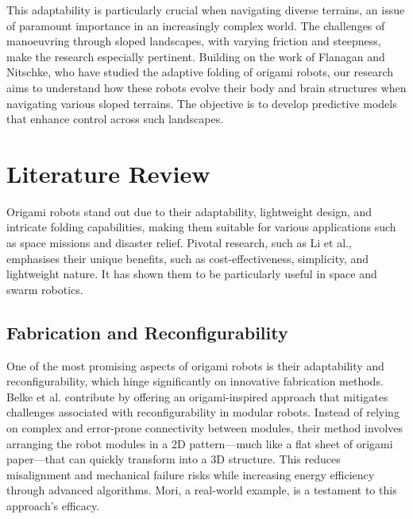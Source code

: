 \documentclass{sigchi}
\begin{document}
This adaptability is particularly crucial when navigating diverse terrains, an issue of paramount importance in an increasingly complex world. The challenges of manoeuvring through sloped landscapes, with varying friction and steepness, make the research especially pertinent. Building on the work of Flanagan and Nitschke\cite{flanagan_evolving_2023}, who have studied the adaptive folding of origami robots, our research aims to understand how these robots evolve their body and brain structures when navigating various sloped terrains. The objective is to develop predictive models that enhance control across such landscapes.




\section{Literature Review}
Origami robots stand out due to their adaptability, lightweight design, and intricate folding capabilities, making them suitable for various applications such as space missions and disaster relief. Pivotal research, such as Li et al., emphasises their unique benefits, such as cost-effectiveness, simplicity, and lightweight nature. It has shown them to be particularly useful in space and swarm robotics\cite{li_soft_2018}.


\subsection{Fabrication and Reconfigurability}
One of the most promising aspects of origami robots is their adaptability and reconfigurability, which hinge significantly on innovative fabrication methods. Belke et al. contribute by offering an origami-inspired approach that mitigates challenges associated with reconfigurability in modular robots. Instead of relying on complex and error-prone connectivity between modules, their method involves arranging the robot modules in a 2D pattern—much like a flat sheet of origami paper—that can quickly transform into a 3D structure\cite{yao_reconfiguration_2019}. This reduces misalignment and mechanical failure risks while increasing energy efficiency through advanced algorithms. Mori, a real-world example, is a testament to this approach's efficacy\cite{belke_mori_2017}.
\end{document}
